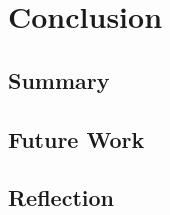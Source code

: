 \documentclass{l4proj}
\begin{document}
\chapter{Conclusion}
\section{Summary}
\section{Future Work}
\section{Reflection}

























\begin{appendices}
\end{appendices}




\end{document}
